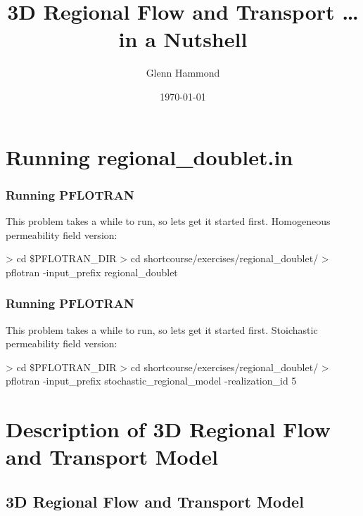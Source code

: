\documentclass{beamer}
\begin{document}
\title{3D Regional Flow and Transport \ldots in a Nutshell}
\author{Glenn Hammond}
\date{\today}


\section{Running regional_doublet.in}

\begin{frame}[fragile]\frametitle{Running PFLOTRAN}

This problem takes a while to run, so lets get it started first.
Homogeneous permeability field version:

\begin{semiverbatim}

 > cd \$PFLOTRAN_DIR
 > cd shortcourse/exercises/regional_doublet/
 > pflotran -input_prefix regional_doublet

\end{semiverbatim}

\end{frame}

\begin{frame}[fragile]\frametitle{Running PFLOTRAN}

This problem takes a while to run, so lets get it started first.
Stoichastic permeability field version:

\begin{semiverbatim}
 > cd \$PFLOTRAN_DIR
 > cd shortcourse/exercises/regional_doublet/
 > pflotran -input_prefix stochastic_regional_model
  -realization_id 5
\end{semiverbatim}

\end{frame}

\section{Description of 3D Regional Flow and Transport Model}

\subsection{3D Regional Flow and Transport Model}
\end{document}
